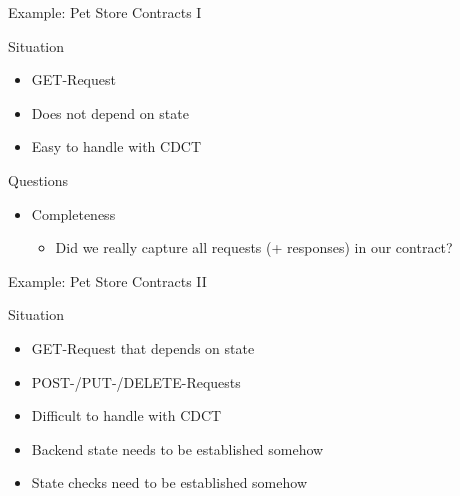 \begin{frame}[fragile]{Example: Pet Store Contracts I}

  

\end{frame}


\begin{frame}[fragile]{Situation}

\begin{itemize}[<+->]
\item GET-Request
\item Does not depend on state
\item Easy to handle with CDCT
\end{itemize}
\end{frame}

\begin{frame}[fragile]{Questions}

\begin{itemize}[<+->]
\item Completeness
\begin{itemize}
\item Did we really capture all requests (+ responses) in our contract?
\end{itemize}
\end{itemize}

\end{frame}


\begin{frame}[fragile]{Example: Pet Store Contracts II}

  

\end{frame}


\begin{frame}[fragile]{Situation}

\begin{itemize}[<+->]
\item GET-Request that depends on state
\item POST-/PUT-/DELETE-Requests
\item Difficult to handle with CDCT
\item Backend state needs to be established somehow
\item State checks need to be established somehow
\end{itemize}
\end{frame}


